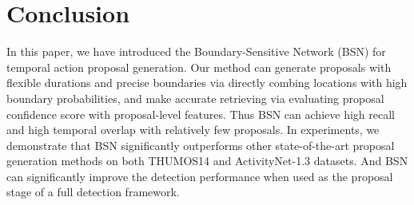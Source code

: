 \documentclass[runningheads]{llncs}
\begin{document}




\section{Conclusion}

In this paper, we have introduced the Boundary-Sensitive Network (BSN) for temporal action proposal generation. Our method can generate proposals with flexible durations and precise boundaries via directly combing locations with high boundary probabilities, and make accurate  retrieving via evaluating proposal confidence score with proposal-level features. Thus BSN can achieve high recall and high temporal overlap with relatively few proposals.
In experiments, we demonstrate that BSN significantly outperforms other state-of-the-art proposal generation methods on both THUMOS14 and ActivityNet-1.3 datasets. And BSN can significantly improve  the detection performance when used as the proposal stage of a full detection framework.


\newpage



\end{document}
